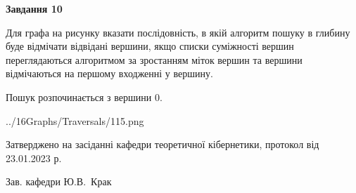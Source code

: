 \documentclass[12pt, ukrainian]{article}
\begin{document}
{\begin {large}
{\begin {center}\textbf{Завдання 10}\end {center}}\par
Для графа на рисунку вказати послідовність, в якій алгоритм пошуку в глибину буде відмічати відвідані вершини, якщо списки суміжності вершин переглядаються алгоритмом за зростанням міток вершин та вершини відмічаються на першому вход\-женні у вершину.\par
Пошук розпочинається з вершини 0.\par

\begin{center}
	{../16Graphs/Traversals/115.png}
\end{center}\par
\newpage


\end {large}
}
{\smallskip \begin {small} Затверджено на засіданні кафедри теоретичної кібернетики, протокол  від   23.01.2023 р.\par\smallskip\smallskip
{\parbox {6.5 cm}{Зав. кафедри \dotfill Ю.В.~Крак}} \end{small}}
\end{document}
